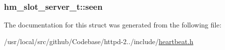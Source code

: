 \subsubsection[{\texorpdfstring{seen}{seen}}]{ hm\+\_\+slot\+\_\+server\+\_\+t\+::seen}\hypertarget{structhm__slot__server__t_a8d1a3cff3e4aa8dc54e118b335ca0716}{}\label{structhm__slot__server__t_a8d1a3cff3e4aa8dc54e118b335ca0716}


The documentation for this struct was generated from the following file\+:\begin{DoxyCompactItemize}
\item 
/usr/local/src/github/\+Codebase/httpd-\/2../include/\hyperlink{heartbeat_8h}{heartbeat.\+h}\end{DoxyCompactItemize}
